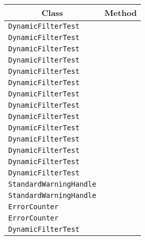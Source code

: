 \begin{center}
\begin{tabular}{ll}\toprule
\multicolumn{1}{c}{Class}&\multicolumn{1}{c}{Method}\\\midrule
\lstinline/DynamicFilterTest/&\raisebox{0pt}{\lstinline/ queryWithFilters()/}\\ 
\lstinline/DynamicFilterTest/&\raisebox{0pt}{\lstinline/ queryWithFilters()/}\\ 
\lstinline/DynamicFilterTest/&\raisebox{0pt}{\lstinline/ queryWithFilters()/}\\ 
\lstinline/DynamicFilterTest/&\raisebox{0pt}{\lstinline/ queryWithFilters()/}\\ 
\lstinline/DynamicFilterTest/&\raisebox{0pt}{\lstinline/ queryWithFilters()/}\\ 
\lstinline/DynamicFilterTest/&\raisebox{0pt}{\lstinline/ queryWithFilters()/}\\ 
\lstinline/DynamicFilterTest/&\raisebox{0pt}{\lstinline/ queryWithFilters()/}\\ 
\lstinline/DynamicFilterTest/&\raisebox{0pt}{\lstinline/ queryWithFilters()/}\\ 
\lstinline/DynamicFilterTest/&\raisebox{0pt}{\lstinline/ queryWithFilters()/}\\ 
\lstinline/DynamicFilterTest/&\raisebox{0pt}{\lstinline/ queryWithFilters()/}\\ 
\lstinline/DynamicFilterTest/&\raisebox{0pt}{\lstinline/ queryWithFilters()/}\\ 
\lstinline/DynamicFilterTest/&\raisebox{0pt}{\lstinline/ queryWithFilters()/}\\ 
\lstinline/DynamicFilterTest/&\raisebox{0pt}{\lstinline/ queryWithFilters()/}\\ 
\lstinline/DynamicFilterTest/&\raisebox{0pt}{\lstinline/ queryWithFilters()/}\\ 
\lstinline/StandardWarningHandle/&\raisebox{0pt}{\lstinline/ logWarning(String,String)/}\\ 
\lstinline/StandardWarningHandle/&\raisebox{0pt}{\lstinline/ logWarning(String,String)/}\\ 
\lstinline/ErrorCounter/&\raisebox{0pt}{\lstinline/ reportError(String)/}\\ 
\lstinline/ErrorCounter/&\raisebox{0pt}{\lstinline/ reportError(RecognitionException)/}\\ 
\lstinline/DynamicFilterTest/&\raisebox{0pt}{\lstinline/ getFilters()/}\\ 

\end{tabular}
\end{center}
